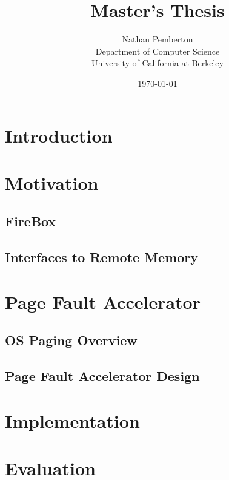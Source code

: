 \documentclass[12pt]{article}
\title{Master's Thesis}
\author{
        Nathan Pemberton \\
                Department of Computer Science \\
                University of California at Berkeley
}
\date{\today}
\begin{document}
\maketitle

\newpage



\newpage
\tableofcontents
\newpage

\section{Introduction} \label{sec_intro}
    

\section{Motivation}
    \subsection{FireBox} \label{sec_firebox}
        
    \subsection{Interfaces to Remote Memory} \label{sec_rmemApproaches}
        
        
\section{Page Fault Accelerator} \label{sec_pfa}
    \subsection{OS Paging Overview} \label{sec_pagingOverview}
        
    \subsection{Page Fault Accelerator Design} \label{sec_pfaDesign}
        

        
\section{Implementation} \label{sec_impl}
    

\section{Evaluation} \label{sec_eval}
\end{document}
